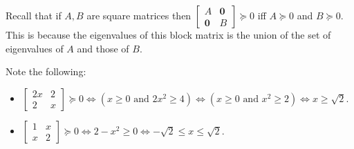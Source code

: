 \soln

Recall that if $A,B$ are square matrices then $\begin{bmatrix}A&\pmb 0\\\pmb 0&B\end{bmatrix}\succeq 0$ iff $A\succeq 0$ and $B\succeq 0$. This is because the eigenvalues of this block matrix is the union of the set of eigenvalues of $A$ and those of $B$.

Note the following:
\begin{itemize}
\item $\begin{bmatrix}2x&2\\2&x\end{bmatrix}\succeq 0\iff (x\ge 0\text{ and } 2x^{2}\ge 4) \iff (x\ge 0 \text{ and } x^{2}\ge 2) \iff x\ge \sqrt 2$.
\item $\begin{bmatrix}1&x\\x&2\end{bmatrix}\succeq 0\iff 2-x^{2}\ge 0 \iff -\sqrt 2\le x\le \sqrt 2$.
\end{itemize}

